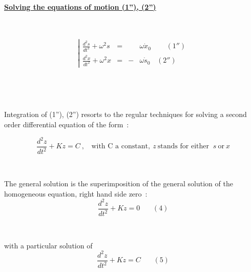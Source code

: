 \documentclass[12pt]{paper}
\newcommand{\nin}{\noindent}
\begin{document}
~


\clearpage 


\paragraph{\underline{Solving the equations of motion (1''), (2'')}} ~ ~ ~ 

$$\left| 
\begin{array}{lcclrccc} 
  \frac{\textstyle{d^2s}}{\textstyle{dt^2}} + \omega^2 s &=&  & \omega \dot x_0 & ~ ~ ~ ~ ~ ~   (1'')\\
\frac{\textstyle{d^2x}}{\textstyle{dt^2}}  +  \omega^2 x &=& -& \omega \dot s_0  &  (2'')
\end{array} 
\right.$$

~

~

\nin Integration of (1''), (2'') resorts to the regular techniques for solving a second order differential equation of 
the form~: 

$$\frac{\textstyle{d^2z}}{\textstyle{dt^2}} + K z   = C ~, ~ ~ ~  ~ \textrm{with C a constant}, ~  z ~ \textrm{stands for either } ~ s ~ \textrm{or} ~  x$$


~


\nin The general solution is the superimposition of the general solution of the homogeneous equation, right hand side zero~:
$$\frac{\textstyle{d^2z}}{\textstyle{dt^2}} + K z   = 0 ~ ~ ~ ~ ~ ~ ~ ~ (4)$$

~

\nin with a particular solution of 
$$\frac{\textstyle{d^2z}}{\textstyle{dt^2}} + K z   = C ~ ~ ~ ~ ~ ~ ~ ~ (5)$$




\clearpage 
\end{document}
